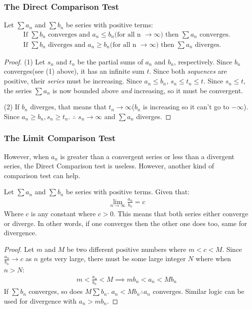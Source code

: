 \documentclass{article}
\begin{document}
\subsubsection{The Direct Comparison Test}
Let $\sum a_n$ and $\sum b_n$ be series with positive terms:
\begin{gather}
    \textrm{If } \sum b_n \textrm{ converges and } a_n \leqslant b_n\textrm{(for all n $\to \infty$) then } \sum a_n \textrm{ converges.}\\
    \textrm{If } \sum b_n \textrm{ diverges and } a_n \geqslant b_n\textrm{(for all n $\to \infty$) then } \sum a_n \textrm{ diverges.}
\end{gather}
\begin{proof}
(1) Let $s_n$ and $t_n$ be the partial sums of $a_n$ and $b_n$, respectively. Since $b_n$ converges(see (1) above), it has an infinite sum $t$. Since both \textit{sequences} are positive, their \textit{series} must be increasing. Since $a_n \leqslant b_n$, $s_n \leqslant t_n \leqslant t$. Since $s_n \leqslant t$, the series $\sum a_n$ is now bounded above \textit{and} increasing, so it must be convergent.

(2) If $b_n$ diverges, that means that $t_n \to \infty$($b_n$ is increasing so it can't go to $-\infty$). Since $a_n \geqslant b_n, s_n \geqslant t_n$. $\therefore$ $ s_n \to \infty$ and $\sum a_n$ diverges.
\end{proof}
\subsubsection{The Limit Comparison Test}
However, when $a_n$ is greater than a convergent series or less than a divergent series, the Direct Comparison test is useless. However, another kind of comparison test can help.

Let $\sum a_n$ and $\sum b_n$ be series with positive terms. Given that:
\begin{gather*}
    \lim_{n \to \infty} \frac{a_n}{b_n} = c
\end{gather*}
Where $c$ is any constant where $c > 0$. This means that both series either converge or diverge. In other words, if one converges then the other one does too, same for divergence.
\begin{proof}
Let $m$ and $M$ be two different positive numbers where $m < c < M$. Since $\frac{a_n}{b_n} \to c$ as $n$ gets very large, there must be some large integer $N$ where when $n > N$:
\begin{gather*}
    m < \frac{a_n}{b_n} < M \implies mb_n < a_n < Mb_n
\end{gather*}
If $\sum b_n$ converges, so does $M \sum b_n$. $a_n < Mb_n \therefore a_n$ converges. Similar logic can be used for divergence with $a_n > mb_n$.
\end{proof}
\end{document}
